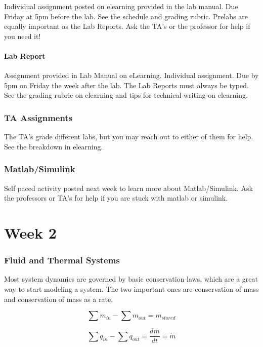 \documentclass[12pt, a4paper]{report}
\begin{document}
  Individual assignment posted on elearning provided in the lab manual. Due Friday at 5pm before the lab. See the schedule and grading rubric. Prelabs are equally important as the Lab Reports. Ask the TA's or the professor for help if you need it!

  \subsection{Lab Report}

  Assignment provided in Lab Manual on eLearning. Individual assignment. Due by 5pm on Friday the week after the lab. The Lab Reports must always be typed. See the grading rubric on elearning and tips for technical writing on elearning.

  \section{TA Assignments}

  The TA's grade different labs, but you may reach out to either of them for help. See the breakdown in elearning.

  \section{Matlab/Simulink}

  Self paced activity posted next week to learn more about Matlab/Simulink. Ask the professors or TA's for help if you are stuck with matlab or simulink.



  \part{Week 2}

  \section{Fluid and Thermal Systems}
  Most system dynamics are governed by basic conservation laws, which are a great way to start modeling a system. The two important ones are conservation of mass and conservation of mass as a rate,

  \begin{equation}
    \sum m_{in} - \sum m_{out} = m_{stored}
  \end{equation}

  \begin{equation}
    \sum q_{in} - \sum q_{out} = \frac{dm}{dt} = \dot m
  \end{equation}
\end{document}
